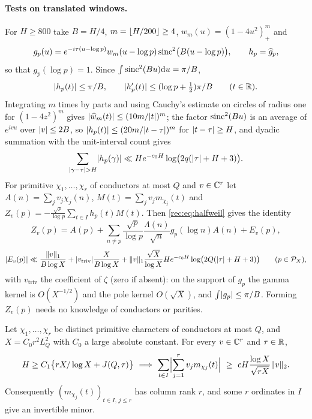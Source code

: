\paragraph{Tests on translated windows.}
For $H\ge800$ take $B=H/4$, $m=\lfloor H/200\rfloor\ge4$, $w_m(u)=(1-4u^2)_+^m$ and
\[
 g_p(u)=e^{-i\tau(u-\log p)}w_m(u-\log p)\operatorname{sinc}^2\bigl(B(u-\log p)\bigr),\qquad h_p=\widehat g_p,
\]
so that $g_p(\log p)=1$. Since $\int\operatorname{sinc}^2(Bu)\mathrm{d} u=\pi/B$,
\begin{equation}\label{rec:eq:lowlip}
 \lvert h_p(t)\rvert\le\pi/B,\qquad\lvert h_p'(t)\rvert\le(\log p+\tfrac12)\pi/B\qquad(t\in\mathbb{R}).
\end{equation}
Integrating $m$ times by parts and using Cauchy's estimate on circles of radius one for $(1-4z^2)^m$
gives $\lvert\widehat w_m(t)\rvert\le(10m/\lvert t\rvert)^m$; the factor $\operatorname{sinc}^2(Bu)$ is an average of $e^{ivu}$ over
$\lvert v\rvert\le2B$, so $\lvert h_p(t)\rvert\le(20m/\lvert t-\tau\rvert)^m$ for $\lvert t-\tau\rvert\ge H$, and dyadic summation with the
unit-interval count gives
\begin{equation}\label{rec:eq:lowtail}
 \sum_{\lvert\gamma-\tau\rvert>H}\lvert h_p(\gamma)\rvert\ll He^{-c_0H}\log\bigl(2q(\lvert\tau\rvert+H+3)\bigr).
\end{equation}
For primitive $\chi_1,\dots,\chi_r$ of conductors at most $Q$ and $v\in\mathbb{C}^r$ let
$A(n)=\sum_jv_j\chi_j(n)$, $M(t)=\sum_jv_jm_{\chi_j}(t)$ and
$Z_v(p)=-\frac{\sqrt p}{\log p}\sum_{t\in I}h_p(t)M(t)$. Then \eqref{rec:eq:halfweil} gives the identity
\begin{equation}\label{rec:eq:lowobs}
 Z_v(p)=A(p)+\sum_{n\ne p}\frac{\sqrt p}{\log p}\frac{\Lambda(n)}{\sqrt n}g_p(\log n)A(n)+E_v(p),
\end{equation}
\[
 \lvert E_v(p)\rvert\ll\frac{\lVert v\rVert_1}{B\log X}+\lvert v_{\mathrm{triv}}\rvert\frac X{B\log X}
 +\lVert v\rVert_1\frac{\sqrt X}{\log X}He^{-c_0H}\log\bigl(2Q(\lvert\tau\rvert+H+3)\bigr)\qquad(p\in\mathcal P_X),
\]
with $v_{\mathrm{triv}}$ the coefficient of $\zeta$ (zero if absent): on the support of $g_p$ the gamma
kernel is $O(X^{-1/2})$ and the pole kernel $O(\sqrt X)$, and $\int\lvert g_p\rvert\le\pi/B$. Forming $Z_v(p)$ needs no
knowledge of conductors or parities.

\begin{theorem}\label{rec:thm:family}
Let $\chi_1,\dots,\chi_r$ be distinct primitive characters of conductors at most $Q$, and
$X=C_0r^2L_Q^2$ with $C_0$ a large absolute constant. For every $v\in\mathbb{C}^r$ and $\tau\in\mathbb{R}$,
\[
 H\ge C_1\bigl\{rX/\log X+J(Q,\tau)\bigr\}\ \Longrightarrow\
 \sum_{t\in I}\Bigl\lvert\sum_{j=1}^rv_jm_{\chi_j}(t)\Bigr\rvert\ \ge\ cH\frac{\log X}{\sqrt{rX}}\norm v_2 .
\]
Consequently $(m_{\chi_j}(t))_{t\in I,\,j\le r}$ has column rank $r$, and some $r$ ordinates in $I$ give an
invertible minor.
\end{theorem}

